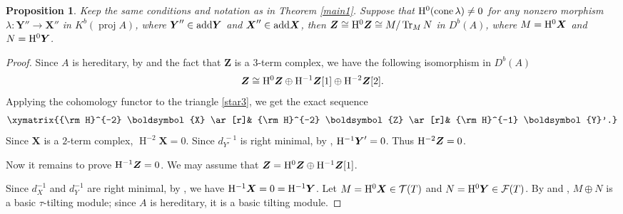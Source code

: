\documentclass[reqno,12pt]{amsart}
\numberwithin{equation}{section}
\theoremstyle{plain}
\newtheorem{proposition}[theorem]{\bf Proposition}
\theoremstyle{definition}
\begin{document}
\begin{proposition}\label{mac}
Keep the same conditions and notation as in Theorem \ref{main1}. Suppose that
${\rm H}^{0}(\operatorname{cone}\lambda)\neq0$ for any nonzero morphism
$\lambda:\boldsymbol{Y}''\longrightarrow\boldsymbol{X}''$
in $K^b(\operatorname{proj}A)$,
where $\boldsymbol{Y}''\in{\rm add}\boldsymbol{Y}$ and
$\boldsymbol{X}''\in{\rm add}\boldsymbol{X}$, then
$\boldsymbol{Z}\cong{\rm H}^{0}\boldsymbol{Z}
\cong M/\operatorname{Tr}_MN$
in $D^b(A)$, where
$M={\rm H}^{0}\boldsymbol{X}$ and $N={\rm H}^{0}\boldsymbol{Y}$.
\end{proposition}


\begin{proof}
Since $A$ is hereditary, by
\cite[Proposition 2.1.2]{KAP} and the fact that $\boldsymbol{Z}$ is a $3$-term complex, we have the following isomorphism in $D^b(A)$
\[
\boldsymbol{Z}\cong{\rm H}^{0}\boldsymbol{Z} \oplus {\rm H}^{-1}\boldsymbol{Z}[1] \oplus {\rm H}^{-2}\boldsymbol{Z}[2].
\]
Applying the cohomology functor to the triangle \eqref{star3}, we get the exact sequence
\[\xymatrix{{\rm H}^{-2} \boldsymbol{X} \ar[r]& {\rm H}^{-2} \boldsymbol{Z} \ar[r]& {\rm H}^{-1} \boldsymbol{Y}'.}\]
Since $\boldsymbol{X}$ is a $2$-term complex, $\operatorname{H}^{-2} \boldsymbol{X}=0$.
Since $d_{Y'}^{\,-1}$ is right minimal, by \cite[Proposition 5.5]{MAR}, ${\rm H}^{-1}\boldsymbol{Y}'=0$. Thus ${\rm H}^{-2}\boldsymbol{Z}=0$.

Now it remains to prove ${\rm H}^{-1}\boldsymbol{Z}=0$. We may assume that
$\boldsymbol{Z}={\rm H}^{0}\boldsymbol{Z}\oplus
{\rm H}^{-1}\boldsymbol{Z}[1]$.

Since $d_X^{-1}$ and $d_Y^{-1}$ are right minimal, by \cite[Proposition 5.5]{MAR}, we have
 ${\rm H}^{-1}\boldsymbol{X}=0={\rm H}^{-1}\boldsymbol{Y}$. Let
$M={\rm H}^{0}\boldsymbol{X}\in\mathcal{T}(T)$ and
$N={\rm H}^{0}\boldsymbol{Y}\in\mathcal{F}(T)$. By
\cite[Theorem 3.1]{MUC} and \cite[Proposition 5.6]{MAR}, $M\oplus N$ is a
basic $\tau$-tilting module; since $A$ is hereditary, it is a basic tilting
module.


\end{proof}
\end{document}
